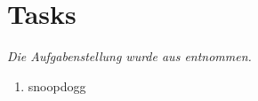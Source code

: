 \section{Tasks}
\label{sec:Aufgabenstellung}
\textit{Die Aufgabenstellung wurde aus \cite{LAB} entnommen.}
\begin{enumerate}
    \item snoopdogg
\end{enumerate}